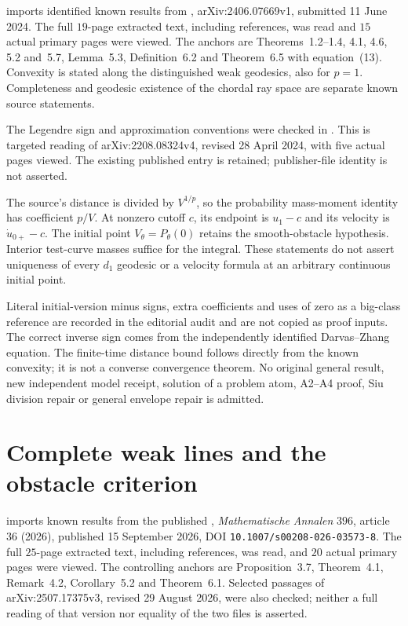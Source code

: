  imports identified known results
from \cite{Gupta24BigRaysV1}, arXiv:2406.07669v1, submitted
11 June 2024. The full $19$-page extracted text, including references,
was read and $15$ actual primary pages were viewed. The anchors are
Theorems~1.2--1.4, 4.1, 4.6, 5.2 and~5.7, Lemma~5.3,
Definition~6.2 and Theorem~6.5 with equation~(13).
Convexity is stated along the distinguished weak geodesics, also
for $p=1$. Completeness and geodesic existence of the chordal ray
space are separate known source statements.

The Legendre sign and approximation conventions were checked in
\cite[equation~(18); Remark~3.3; Theorem~3.7;
Proposition~3.8; Theorem~3.9]{DarvasZhang24TwistedV4}.
This is targeted reading of arXiv:2208.08324v4, revised
28 April 2024, with five actual pages viewed. The existing published
entry \cite{DZ22} is retained; publisher-file identity is not asserted.

The source's distance is divided by $V^{1/p}$, so the probability
mass-moment identity has coefficient $p/V$. At nonzero cutoff $c$,
its endpoint is $u_1-c$ and its velocity is $\dot u_{0+}-c$.
The initial point $V_\theta=P_\theta(0)$ retains the smooth-obstacle
hypothesis. Interior test-curve masses suffice for the integral.
These statements do not assert uniqueness of every $d_1$ geodesic
or a velocity formula at an arbitrary continuous initial point.

Literal initial-version minus signs, extra coefficients and uses
of zero as a big-class reference are recorded in the editorial
audit and are not copied as proof inputs. The correct inverse sign
comes from the independently identified Darvas--Zhang equation.
The finite-time distance bound follows directly from the known
convexity; it is not a converse convergence theorem.
No original general result, new independent model receipt,
solution of a problem atom, A2--A4 proof, Siu division repair or
general envelope repair is admitted.

\section{Complete weak lines and the obstacle criterion}
\label{sec:provenance-complete-weak-lines}

 imports known results from
the published \cite{DarvasMcCleerey26Lines},
\emph{Mathematische Annalen} $396$, article $36$ (2026),
published 15 September 2026, DOI
\texttt{10.1007/s00208-026-03573-8}.
The full $25$-page extracted text, including references,
was read, and $20$ actual primary pages were viewed.
The controlling anchors are Proposition~3.7, Theorem~4.1,
Remark~4.2, Corollary~5.2 and Theorem~6.1.
Selected passages of arXiv:2507.17375v3, revised
29 August 2026, were also checked; neither a full reading
of that version nor equality of the two files is asserted.

